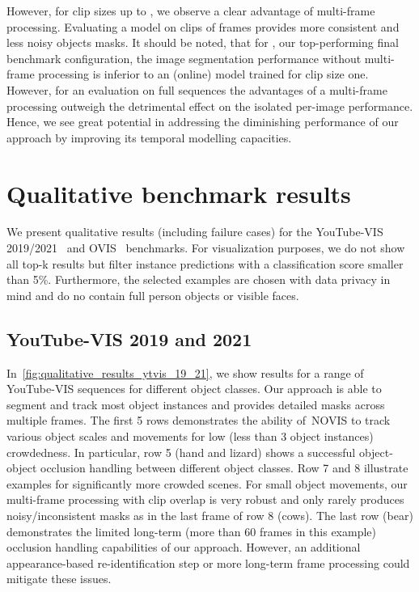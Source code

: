 \documentclass{article}
\newcommand{\method}{\mbox{NOVIS}}
\theoremstyle{plain}
\theoremstyle{definition}
\theoremstyle{remark}
\begin{document}
However, for clip sizes up to , we observe a clear advantage of multi-frame processing.
Evaluating a model on clips of frames provides more consistent and less noisy objects masks.
It should be noted, that for , our top-performing final benchmark configuration, the image segmentation performance without multi-frame processing is inferior to an (online) model trained for clip size one.
However, for an evaluation on full sequences the advantages of a multi-frame processing outweigh the detrimental effect on the isolated per-image performance.
Hence, we see great potential in addressing the diminishing performance of our approach by improving its temporal modelling capacities.








\section{Qualitative benchmark results}
We present qualitative results (including failure cases) for the YouTube-VIS 2019/2021~\cite{Yang2019vis} and OVIS~\cite{ovis} benchmarks.
For visualization purposes, we do not show all top-k results but filter instance predictions with a classification score smaller than 5\%.
Furthermore, the selected examples are chosen with data privacy in mind and do no contain full person objects or visible faces.





\subsection{YouTube-VIS 2019 and 2021}
In~\cref{fig:qualitative_results_ytvis_19_21}, we show results for a range of YouTube-VIS sequences for different object classes. 
Our approach is able to segment and track most object instances and provides detailed masks across multiple frames.
The first 5 rows demonstrates the ability of~\method{} to track various object scales and movements for low (less than 3 object instances) crowdedness.
In particular, row 5 (hand and lizard) shows a successful object-object occlusion handling between different object classes.
Row 7 and 8 illustrate examples for significantly more crowded scenes.
For small object movements, our multi-frame processing with clip overlap is very robust and only rarely produces noisy/inconsistent masks as in the last frame of row 8 (cows).
The last row (bear) demonstrates the limited long-term (more than 60 frames in this example) occlusion handling capabilities of our approach.
However, an additional appearance-based re-identification step or more long-term frame processing could mitigate these issues.
\end{document}
